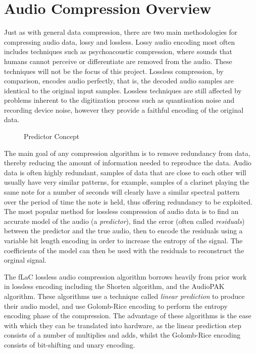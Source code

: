 \documentclass[12pt]{scrartcl}
\begin{document}
  \section{Audio Compression Overview}
  Just as with general data compression, there are two main methodologies for compressing audio data, lossy and lossless. Lossy audio encoding most often includes techniques such as psychoacoustic compression, where sounds that humans cannot perceive or differentiate are removed from the audio\cite{principles_of_digital_audio}. These techniques will not be the focus of this project. Lossless compression, by comparison, encodes audio perfectly, that is, the decoded audio samples are identical to the original input samples. Lossless techniques are still affected by problems inherent to the digitization process such as quantisation noise and recording device noise, however they provide a faithful encoding of the original data.
  
   \begin{figure}[H]
    \caption{Predictor Concept}
    \label{fig:pred_theory}
  \end{figure}
  
  The main goal of any compression algorithm is to remove redundancy from data, thereby reducing the amount of information needed to reproduce the data. Audio data is often highly redundant, samples of data that are close to each other will usually have very similar patterns, for example, samples of a clarinet playing the same note for a number of seconds will clearly have a similar spectral pattern over the period of time the note is held, thus offering redundancy to be exploited. The most popular method for lossless compression of audio data is to find an accurate model of the audio (a \textit{predictor}), find the error (often called \textit{residuals}) between the predictor and the true audio, then to encode the residuals using a variable bit length encoding in order to increase the entropy of the signal\cite{lpc_model_comparison}. The coefficients of the model can then be used with the residuals to reconstruct the orginal signal.
  
  The fLaC lossless audio compression algorithm borrows heavily from prior work in lossless encoding including the Shorten algorithm\cite{shorten}, and the AudioPAK algorithm\cite{audiopak}. These algorithms use a technique called \textit{linear prediction} to produce their audio model, and use Golomb-Rice encoding to perform the entropy encoding phase of the compression. The advantage of these algorithms is the ease with which they can be translated into hardware, as the linear prediction step consists of a number of multiplies and adds, whilst the Golomb-Rice encoding consists of bit-shifting and unary encoding.
  
\end{document}
